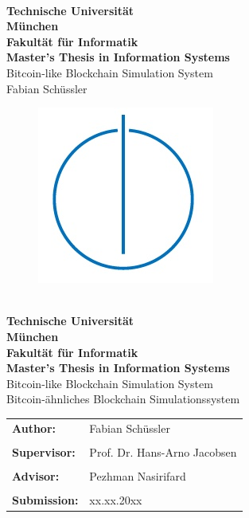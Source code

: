 \documentclass[12pt]{report}
\begin{document}
\hoffset=5mm
\thispagestyle{empty}
\begin{center}
	\bigskip \bigskip \bigskip 
	\oTUM{6.0cm} \\
	\vspace*{0.8cm}
	{\huge \bf Technische Universität} \\
	\bigskip
	{\huge \bf München} \\
	\bigskip \bigskip \bigskip
	{\huge \bf Fakultät für Informatik} \\
	\bigskip \bigskip \bigskip
	{\Large \bf Master's Thesis in Information Systems} \\
	\bigskip \bigskip \bigskip \bigskip \bigskip
	{\Large  Bitcoin-like Blockchain Simulation System} \\        
	\bigskip \bigskip \bigskip \bigskip
	{\Large Fabian Schüssler} \\    
	\bigskip
	\begin{figure}[ht]
	\centering \includegraphics[width=0.2\linewidth]{figures/infologo.jpg}
	\end{figure}
	\bigskip 
\end{center}
\vfill

\newpage
\hoffset=5mm
\thispagestyle{empty}
\begin{center}
	\bigskip \bigskip \bigskip 
	\oTUM{6.0cm} \\
	\vspace*{0.8cm}
	{\huge \bf Technische Universität} \\
	\bigskip
	{\huge \bf München} \\
	\bigskip \bigskip \bigskip
	{\huge \bf Fakultät für Informatik} \\
	\bigskip \bigskip \bigskip
	{\Large \bf Master's Thesis in Information Systems} \\
	\bigskip \bigskip \bigskip \bigskip \bigskip
	{\Large Bitcoin-like Blockchain Simulation System} \\
	\bigskip \bigskip \bigskip
	{\Large Bitcoin-ähnliches Blockchain Simulationssystem} \\
	\bigskip
\end{center}
\vfill
\begin{tabular}{ll}
{\Large \bf Author:} & {\Large Fabian Schüssler} \\\\
{\Large \bf Supervisor:} & {\Large Prof. Dr. Hans-Arno Jacobsen} \\\\
{\Large \bf Advisor:} & {\Large Pezhman Nasirifard} \\\\
{\Large \bf Submission:} & {\Large xx.xx.20xx}
\end{tabular}
\end{document}
